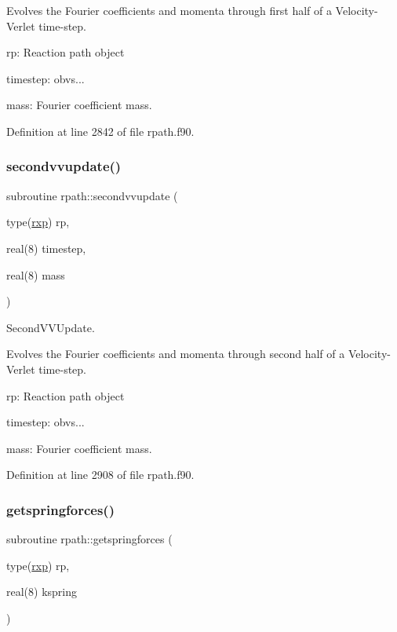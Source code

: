 Evolves the Fourier coefficients and momenta through first half of a Velocity-\/\+Verlet time-\/step.


\begin{DoxyItemize}
\item rp\+: Reaction path object
\item timestep\+: obvs...
\item mass\+: Fourier coefficient mass. 
\end{DoxyItemize}

Definition at line 2842 of file rpath.\+f90.

\mbox{\label{namespacerpath_ac85f7c72e6a51be0d86bde43398f5d1b}} 
\subsubsection{\texorpdfstring{secondvvupdate()}{secondvvupdate()}}
{\footnotesize\ttfamily subroutine rpath\+::secondvvupdate (\begin{DoxyParamCaption}\item[{type(\mbox{\hyperlink{structrpath_1_1rxp}{rxp}})}]{rp,  }\item[{real(8)}]{timestep,  }\item[{real(8)}]{mass }\end{DoxyParamCaption})}



Second\+V\+V\+Update. 

Evolves the Fourier coefficients and momenta through second half of a Velocity-\/\+Verlet time-\/step.


\begin{DoxyItemize}
\item rp\+: Reaction path object
\item timestep\+: obvs...
\item mass\+: Fourier coefficient mass. 
\end{DoxyItemize}

Definition at line 2908 of file rpath.\+f90.

\mbox{\label{namespacerpath_ae05b8e955144357569094f22cb55b245}} 
\subsubsection{\texorpdfstring{getspringforces()}{getspringforces()}}
{\footnotesize\ttfamily subroutine rpath\+::getspringforces (\begin{DoxyParamCaption}\item[{type(\mbox{\hyperlink{structrpath_1_1rxp}{rxp}})}]{rp,  }\item[{real(8)}]{kspring }\end{DoxyParamCaption})}



